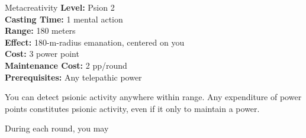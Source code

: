 {Metacreativity}
{
	\textbf{Level:}
	Psion 2\\
	\textbf{Casting Time:}
	1 mental action\\
	\textbf{Range:}
	180 meters\\
	\textbf{Effect:}
	180-m-radius emanation, centered on you\\
	\textbf{Cost:}
	3 power point\\
	\textbf{Maintenance Cost:}
	2 pp/round\\
	\textbf{Prerequisites:}
	Any telepathic power\\
}
{
	You can detect psionic activity anywhere within range. Any expenditure of power points constitutes psionic activity, even if it only to maintain a power.

	During each round, you may
}